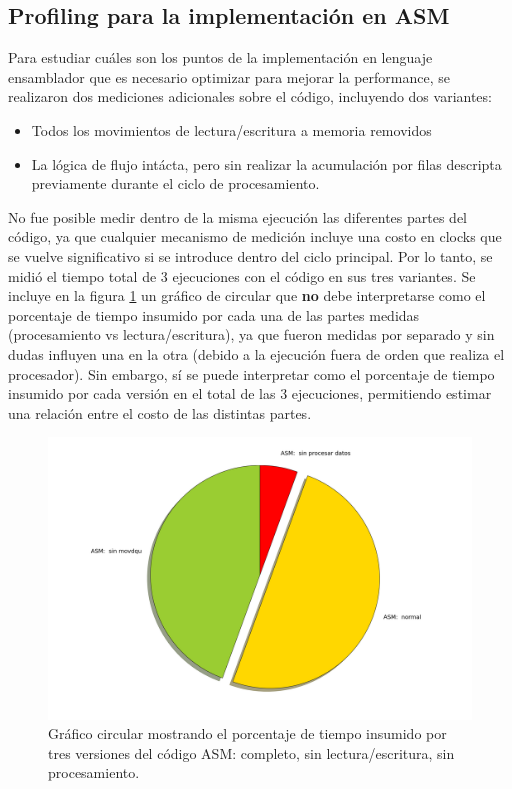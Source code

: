 \subsection{Profiling para la implementación en ASM}
\label{sub:profiling_para_la_implementaci_n_en_asm}

Para estudiar cuáles son los puntos de la implementación en lenguaje ensamblador que es necesario optimizar para mejorar la performance, se realizaron dos mediciones adicionales sobre el código, incluyendo dos variantes:

\begin{itemize}
	\item Todos los movimientos de lectura/escritura a memoria removidos
	\item La lógica de flujo intácta, pero sin realizar la acumulación por filas descripta previamente durante el ciclo de procesamiento.
\end{itemize}

No fue posible medir dentro de la misma ejecución las diferentes partes del código, ya que cualquier mecanismo de medición incluye una costo en clocks que se vuelve significativo si se introduce dentro del ciclo principal. Por lo tanto, se midió el tiempo total de 3 ejecuciones con el código en sus tres variantes. Se incluye en la figura \ref{fig:filtro-miniature-ASM-profiling} un gráfico de circular que \textbf{no} debe interpretarse como el porcentaje de tiempo insumido por cada una de las partes medidas (procesamiento vs lectura/escritura), ya que fueron medidas por separado y sin dudas influyen una en la otra (debido a la ejecución fuera de orden que realiza el procesador). Sin embargo, sí se puede interpretar como el porcentaje de tiempo insumido por cada versión en el total de las 3 ejecuciones, permitiendo estimar una relación entre el costo de las distintas partes.

\begin{figure}[H]
\begin{center}
  \includegraphics[scale=0.35]{secciones/filtro_miniature/graficos/ASM_normal_sinmovdqu_sinprocesardatos.png}
\end{center}
\caption{Gráfico circular mostrando el porcentaje de tiempo insumido por tres versiones del código ASM: completo, sin lectura/escritura, sin procesamiento.}
\label{fig:filtro-miniature-ASM-profiling}
\end{figure}

